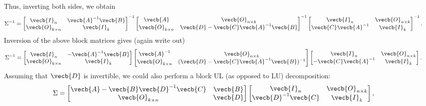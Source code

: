 Thus, inverting both sides, we obtain
\begin{equation*}
	\Sigma^{-1} =
	\begin{bmatrix}
		\vecb{I}_n            & \vecb{A}^{-1} \vecb{B} \\
		\vecb{O}_{k \times n} & \vecb{I}_k
	\end{bmatrix}^{-1}
	\begin{bmatrix}
		\vecb{A}              & \vecb{O}_{n \times k}                      \\
		\vecb{O}_{k \times n} & \vecb{D} - \vecb{C} \vecb{A}^{-1} \vecb{B}
	\end{bmatrix}^{-1}
	\begin{bmatrix}
		\vecb{I}_n             & \vecb{O}_{n \times k} \\
		\vecb{C} \vecb{A}^{-1} & \vecb{I}_k
	\end{bmatrix}^{-1}.
\end{equation*}
Inversion of the above block matrices gives (again write out)
\begin{equation} \label{eq:BlockInverseIntermed}
	\Sigma^{-1} =
	\begin{bmatrix}
		\vecb{I}_n            & -\vecb{A}^{-1} \vecb{B} \\
		\vecb{O}_{k \times n} & \vecb{I}_k
	\end{bmatrix}
	\begin{bmatrix}
		\vecb{A}^{-1}         & \vecb{O}_{n \times k}                             \\
		\vecb{O}_{k \times n} & (\vecb{D} - \vecb{C} \vecb{A}^{-1} \vecb{B})^{-1}
	\end{bmatrix}
	\begin{bmatrix}
		\vecb{I}_n              & \vecb{O}_{n \times k} \\
		-\vecb{C} \vecb{A}^{-1} & \vecb{I}_k
	\end{bmatrix}.
\end{equation}
Assuming that $\vecb{D}$ is invertible, we could also perform a block UL (as opposed to LU) decomposition:
\begin{equation} \label{eq:BlockUL}
	\Sigma =
	\begin{bmatrix}
		\vecb{A} - \vecb{B} \vecb{D}^{-1} \vecb{C} & \vecb{B} \\
		\vecb{O}_{k \times n}                      & \vecb{D}
	\end{bmatrix}
	\begin{bmatrix}
		\vecb{I}_n             & \vecb{O}_{n \times k} \\
		\vecb{D}^{-1} \vecb{C} & \vecb{I}_k
	\end{bmatrix},
\end{equation}
